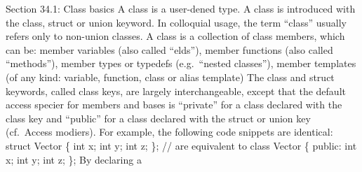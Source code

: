 Section 34.1: Class basics A class is a user-dened type. A class is
introduced with the class, struct or union keyword. In colloquial usage,
the term ``class'' usually refers only to non-union classes. A class is
a collection of class members, which can be: member variables (also
called ``elds''), member functions (also called ``methods''), member
types or typedefs (e.g.~``nested classes''), member templates (of any
kind: variable, function, class or alias template) The class and struct
keywords, called class keys, are largely interchangeable, except that
the default access specier for members and bases is ``private'' for a
class declared with the class key and ``public'' for a class declared
with the struct or union key (cf.~Access modiers). For example, the
following code snippets are identical: struct Vector \{ int x; int y;
int z; \}; // are equivalent to class Vector \{ public: int x; int y;
int z; \}; By declaring a
